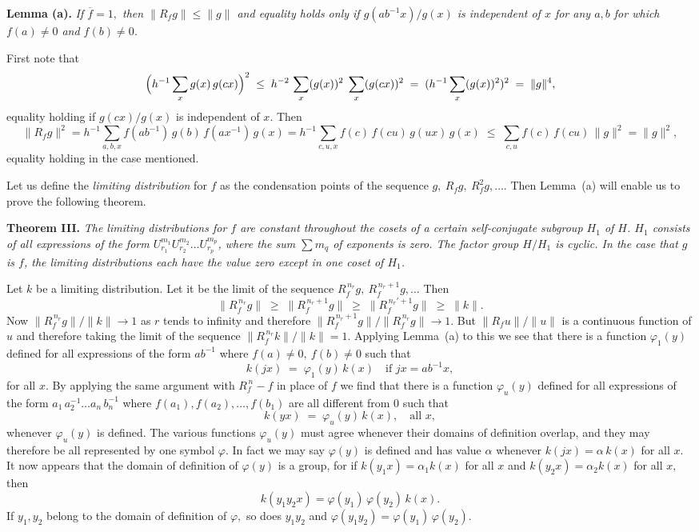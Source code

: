 \documentclass[12pt]{article}
\begin{document}
\medskip

\noindent
{\bf Lemma (a).} {\em If $\overline{f}=1,$ then $\|R_f g\|\le \|g\|$ and equality holds only if $g(ab^{-1}x)/g(x)$ is independent of $x$ for any $a,b$ for which $f(a)\neq 0$ and $f(b)\neq 0$.}

\smallskip

First note that
\[
\Bigl(h^{-1}\sum_x g(x)\,g(cx)\Bigr)^2
\;\le\; h^{-2}\,\sum_x (g(x))^2 \;\sum_x (g(cx))^2
\;=\; (h^{-1}\sum_x (g(x))^2)^2
\;=\;\|g\|^4,
\]
equality holding if $g(cx)/g(x)$ is independent of $x.$ Then
\[
\|R_f g\|^2 
= h^{-1}\sum_{a,b,x} f(ab^{-1})\,g(b)\,f(ax^{-1})\,g(x)
= h^{-1}\sum_{c,u,x} f(c)\,f(cu)\,g(ux)\,g(x)
\;\le\; \sum_{c,u} f(c)\,f(cu)\,\|g\|^2
= \|g\|^2,
\]
equality holding in the case mentioned.

\medskip

Let us define the {\em limiting distribution} for $f$ as the condensation points of the sequence $g,\ R_fg,\ R_f^2 g,\dots.$ Then Lemma~(a) will enable us to prove the following theorem.

\bigskip

\noindent
{\bf Theorem III.} 
{\em The limiting distributions for $f$ are constant throughout the cosets of a certain self‐conjugate subgroup $H_1$ of $H$. $H_1$ consists of all expressions of the form $U_{r_1}^{m_1} U_{r_2}^{m_2}\dots U_{r_p}^{m_p}$, where the sum $\sum m_q$ of exponents is zero. The factor group $H/H_1$ is cyclic. In the case that $g$ is $f$, the limiting distributions each have the value zero except in one coset of $H_1$.}

\medskip

Let $k$ be a limiting distribution. Let it be the limit of the sequence $R_f^{\,n_r}g,\ R_f^{\,n_r+1}g,\dots$ Then
\[
\|R_f^{\,n_r}g\|\;\ge\;\|R_f^{\,n_r+1}g\|\;\ge\;\|R_f^{\,n_r'+1}g\|\;\ge\;\|k\|.
\]
Now $\|R_f^{\,n_r}g\|/\|k\|\to 1$ as $r$ tends to infinity and therefore $\|R_f^{\,n_r+1}g\|/\|R_f^{\,n_r}g\|\to 1.$ But $\|R_f u\|/\|u\|$ is a continuous function of $u$ and therefore taking the limit of the sequence $\|R_f^{\,n_r}k\|/\|k\|=1.$ Applying Lemma~(a) to this we see that there is a function $\varphi_1(y)$ defined for all expressions of the form $ab^{-1}$ where $f(a)\neq 0,\ f(b)\neq 0$ such that
\[
k(jx)\;=\;\varphi_1(y)\,k(x)\quad\text{if }jx=ab^{-1}x,
\]
for all $x$. By applying the same argument with $R_f^{\,n}-f$ in place of $f$ we find that there is a function $\varphi_u(y)$ defined for all expressions of the form $a_1\,a_2^{-1}\dots a_n\,b_n^{-1}$ where $f(a_1), f(a_2),\dots,f(b_1)$ are all different from 0 such that
\[
k(yx)\;=\;\varphi_u(y)\,k(x),\quad\text{all }x,
\]
whenever $\varphi_u(y)$ is defined. The various functions $\varphi_u(y)$ must agree whenever their domains of definition overlap, and they may therefore be all represented by one symbol $\varphi.$ In fact we may say $\varphi(y)$ is defined and has value $\alpha$ whenever $k(jx)=\alpha\,k(x)$ for all $x.$ It now appears that the domain of definition of $\varphi(y)$ is a group, for if $k(y_1 x)=\alpha_1 k(x)$ for all $x$ and $k(y_2 x)=\alpha_2 k(x)$ for all $x,$ then
\[
k(y_1 y_2 x)=\varphi(y_1)\,\varphi(y_2)\,k(x).
\]
If $y_1,y_2$ belong to the domain of definition of $\varphi,$ so does $y_1y_2$ and $\varphi(y_1y_2)=\varphi(y_1)\,\varphi(y_2).$
\end{document}
